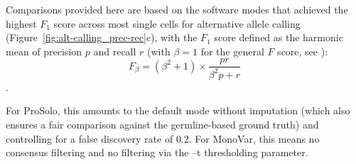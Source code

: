\documentclass[authoryear,preprint,11pt]{scrartcl}
\begin{document}
Comparisons provided here are based on the software modes that achieved the highest $F_1$ score across most single cells for alternative allele calling (Figure~\ref{fig:alt-calling_prec-rec}c), with the $F_1$ score defined as the harmonic mean of precision $p$ and recall $r$ (with $\beta = 1$ for the general $F$ score, see \cite{van_rijsbergen_evaluation_1979,chinchor_muc-4_1992}):\\

\begin{equation} \label{eq:F_1_score}
  F_{\beta} = (\beta^2 + 1) \times \frac{p r}{\beta^2 p + r}
\end{equation}.

For ProSolo, this amounts to the default mode without imputation (which also ensures a fair comparison against the germline-based ground truth) and controlling for a false discovery rate of $0.2$.
For MonoVar, this means no consensus filtering and no filtering via the {\ttfamily --t} thresholding parameter.\\
\end{document}
